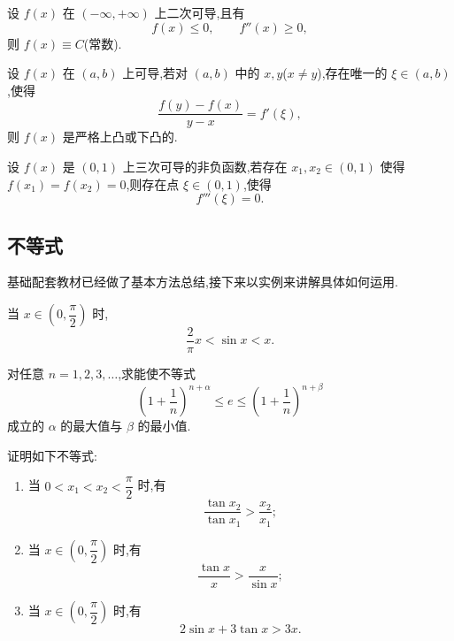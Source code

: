 \documentclass[../../数学分析培优讲义.tex]{subfiles}
\begin{document}
\begin{example}
设 $f(x)$ 在 $(-\infty,+\infty)$ 上二次可导,且有
\[
    f(x)\leq0,
    \qquad f''(x)\geq0,
\]
则 $f(x)\equiv C$(常数).
\end{example}
\exampleblank

\begin{example}
设 $f(x)$ 在 $(a,b)$ 上可导,若对 $(a,b)$ 中的 $x,y$($x\neq y$),存在唯一的 $\xi\in(a,b)$,使得
\[
    \dfrac{f(y)-f(x)}{y-x}=f'(\xi),
\]
则 $f(x)$ 是严格上凸或下凸的.
\end{example}
\exampleblank

\begin{example}
设 $f(x)$ 是 $(0,1)$ 上三次可导的非负函数,若存在 $x_1,x_2\in(0,1)$ 使得 $f(x_1)=f(x_2)=0$,则存在点 $\xi\in(0,1)$,使得
\[
    f'''(\xi)=0.
\]
\end{example}
\exampleblank



\subsection{不等式}

基础配套教材已经做了基本方法总结,接下来以实例来讲解具体如何运用.




\begin{proposition}[\marktwostar]
当 $x\in\left(0,\dfrac{\pi}{2}\right)$ 时,
\[
    \dfrac{2}{\pi}x<\sin x<x.
\]
\end{proposition}

\begin{example}
对任意 $n=1,2,3,\ldots$,求能使不等式
\[
    \left(1+\dfrac{1}{n}\right)^{n+\alpha}
    \leq e
    \leq\left(1+\dfrac{1}{n}\right)^{n+\beta}
\]
成立的 $\alpha$ 的最大值与 $\beta$ 的最小值.
\end{example}
\exampleblank

\begin{example}
证明如下不等式:
\begin{enumerate}[label=(\arabic*)]
    \item 当 $0<x_1<x_2<\dfrac{\pi}{2}$ 时,有
    \[
        \dfrac{\tan x_2}{\tan x_1}>\dfrac{x_2}{x_1};
    \]
    \item 当 $x\in\left(0,\dfrac{\pi}{2}\right)$ 时,有
    \[
        \dfrac{\tan x}{x}>\dfrac{x}{\sin x};
    \]
    \item 当 $x\in\left(0,\dfrac{\pi}{2}\right)$ 时,有
    \[
        2\sin x+3\tan x>3x.
    \]
\end{enumerate}
\end{example}
\exampleblank
\end{document}
